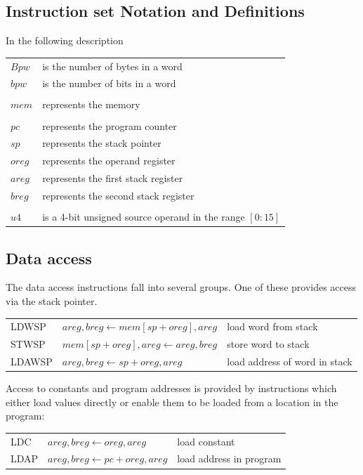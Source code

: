 \documentclass[a4paper, 12pt]{article}
\begin{document}
\subsection*{Instruction set Notation and Definitions}

In the following description

\begin{tabular}{ll}
$Bpw$ &is the number of bytes in a word \\
$bpw$ & is the number of bits in a word \\
&\\
$mem$ & represents the memory \\
&\\
$pc$ & represents the program counter\\
$sp$ & represents the stack pointer\\
$oreg$ & represents the operand register\\
$areg$ & represents the first stack register\\
$breg$ & represents the second stack register\\
&\\
$u4$ & is a 4-bit unsigned source operand in the range $[0:15]$\\
\end{tabular}

\subsection*{Data access}

The data access instructions fall into several groups. One of these
provides access via the stack pointer.

\begin{tabular}{lll}
LDWSP & $areg, breg \leftarrow mem[sp + oreg], areg$& load word from stack \\ 
STWSP & $mem[sp + oreg], areg \leftarrow areg, breg $& store word to stack  \\
LDAWSP & $areg, breg \leftarrow sp + oreg, areg $& load address of word in stack  
\end{tabular}

Access to constants and program addresses is provided by instructions which 
either load values directly or enable them to be loaded from a location in 
the program: 

\begin{tabular}{lll}
LDC  & $areg, breg \leftarrow oreg, areg $& load constant  \\
LDAP & $areg, breg \leftarrow pc + oreg, areg $& load address in program  
\end{tabular}
\end{document}
